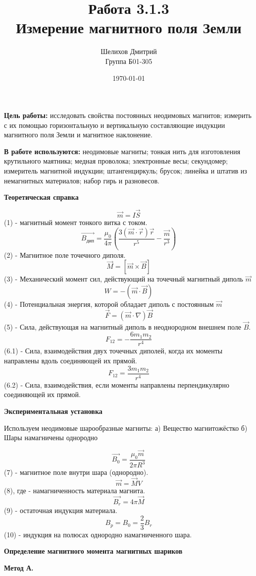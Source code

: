 \documentclass[a4paper,12pt]{article}
\author{Шелихов Дмитрий\\Группа Б01-305}
\title{\textbf{Работа 3.1.3\\Измерение магнитного поля Земли}}
\date{\today}
\begin{document}
 

\maketitle

\textbf{Цель работы:} исследовать свойства постоянных неодимовых магнитов; измерить с их помощью горизонтальную и вертикальную составляющие индукции магнитного поля Земли и магнитное наклонение.

\textbf{В работе используются:} неодимовые магниты; тонкая нить для изготовления крутильного маятника; медная проволока; электронные весы; секундомер; измеритель магнитной индукции; штангенциркуль; брусок; линейка и штатив из немагнитных материалов; набор гирь и разновесов.

\noindent\textbf{Теоретическая справка}

$$ \vec{m} = I\vec{S} $$ (1) - магнитный момент тонкого витка с током. 
$$ \vec {B_{дип}} = \frac {\mu_0}{4\pi}(\frac {3(\vec {m} \cdot \vec{r})\vec{r}}{r^5} - \frac {\vec{m}}{r^3})  $$ (2) - Магнитное поле точечного диполя. 
$$ \vec{M} = [\vec{m} \times \vec{B}]  $$ (3) - Механический момент сил, действующий на точечный магнитный диполь $\vec{m}$ 
$$ W = -(\vec{m} \cdot \vec{B})  $$ (4) - Потенциальная энергия, которой обладает диполь с постоянным $\vec{m}$
$$ \vec{F} = (\vec{m} \cdot \nabla)\vec{B}  $$ (5) - Сила, действующая на магнитный диполь в неоднородном внешнем поле $\vec{B}$.
$$ F_{12} = -\frac {6m_1m_2}{r^4}  $$ (6.1) - Сила, взаимодействия двух точечных диполей, когда их моменты направлены вдоль соединяющей их прямой.
$$ F_{12} = \frac {3m_1m_2}{r^4}  $$ (6.2) - Сила, взаимодействия, если моменты направлены перпендикулярно соединяющей их прямой.

\noindent\textbf{Экспериментальная установка}

Используем неодимовые шарообразные магниты: 
	а) Вещество магнитожёстко
	б) Шары намагничены однородно

$$ \vec {B_0} = \frac {\mu_0 \vec{m}}{2\pi R^3} $$ (7) - магнитное поле внутри шара (однородно).
$$ \vec {m} = \vec{M}V $$ (8), где  - намагниченность материала магнита.
$$ \vec {B_r} = 4\pi\vec{M}  $$ (9) - остаточная индукция материала. 
$$ B_p = B_0 = \frac {2}{3}B_r  $$ (10) - индукция на полюсах однородно намагниченного шара. 

\noindent\textbf{Определение магнитного момента магнитных шариков}

\textbf{Метод А.} 
\end{document}
